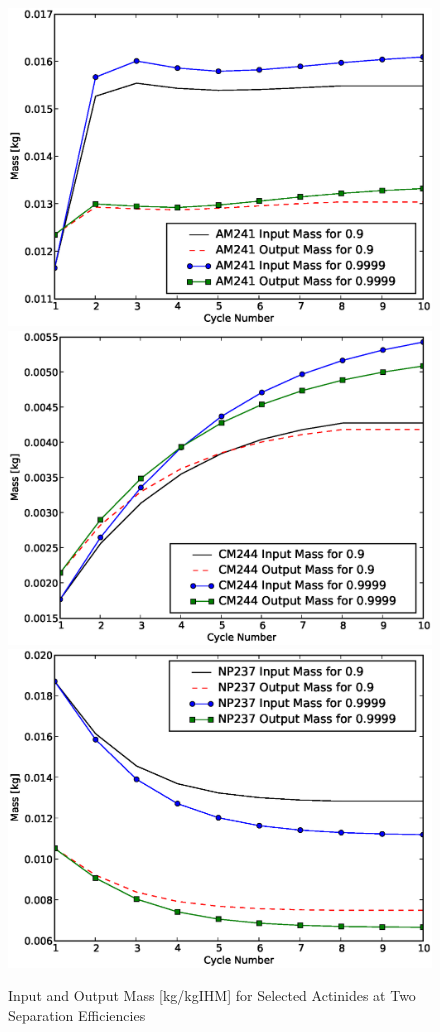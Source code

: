 \begin{figure}[htbp]
\caption{Input and Output Mass [kg/kgIHM] for Selected Actinides at Two Separation Efficiencies}
\label{ses_fig07}
\begin{center}
\includegraphics[scale=0.3]{se_sensitivity/figs/AM241InOutSepEff.eps}
\includegraphics[scale=0.3]{se_sensitivity/figs/CM244InOutSepEff.eps}
\includegraphics[scale=0.3]{se_sensitivity/figs/NP237InOutSepEff.eps}

\end{center}
\end{figure}
